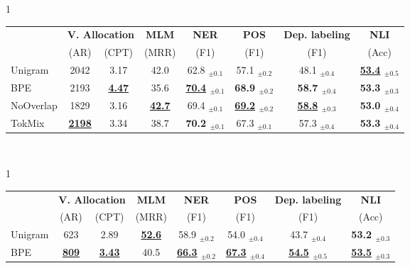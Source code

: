 \begin{table*}[!htb]
\centering
\begin{subtable}{1\linewidth}
  \centering
  \footnotesize
    \begin{tabular}{lccccccc}
    \toprule
    & \multicolumn{2}{c}{\bf{V. Allocation}}  &  \bf{MLM} &               \bf{NER} &               \bf{POS} &                \bf{Dep. labeling} &              \bf{NLI} \\
     & (AR) &   (CPT) &   (MRR) &               (F1) &               (F1) &                (F1) &              (Acc) \\
    \midrule
    Unigram   &      2042 &  3.17 &  42.0 &  62.8 $_{\pm0.1}$ &  57.1 $_{\pm0.2}$ &  48.1 $_{\pm0.4}$ &  \bf{\underline{53.4}} $_{\pm0.5}$ \\
    BPE       &      2193 &  \bf{\underline{4.47}} &  35.6 &  \bf{\underline{70.4}} $_{\pm0.1}$ &  \bf{68.9} $_{\pm0.2}$ &  \bf{58.7} $_{\pm0.4}$ &  \bf{53.3} $_{\pm0.3}$ \\
    NoOverlap &      1829 &  3.16 &  \bf{\underline{42.7}} &  69.4 $_{\pm0.1}$ &  \bf{\underline{69.2}} $_{\pm0.2}$ &  \bf{\underline{58.8}} $_{\pm0.3}$ &  \bf{53.0} $_{\pm0.4}$ \\
    TokMix    &      \bf{\underline{2198}} &  3.34 &  38.7 &  \bf{70.2} $_{\pm0.1}$ &  67.3 $_{\pm0.1}$ &  57.3 $_{\pm0.4}$ &  \bf{53.3} $_{\pm0.4}$ \\
    \bottomrule
    \end{tabular}
    \caption{6 languages}
    \label{tab:in_lang_avg}
\end{subtable} \\
\begin{subtable}{1\linewidth}
  \centering
    \small
    \begin{tabular}{lccccccc}
    \toprule
    & \multicolumn{2}{c}{\bf{V. Allocation}}  &  \bf{MLM} &               \bf{NER} &               \bf{POS} &                \bf{Dep. labeling} &              \bf{NLI} \\
     & (AR) &   (CPT) &   (MRR) &               (F1) &               (F1) &                (F1) &              (Acc) \\
    \midrule
    Unigram   &       623 &  2.89 &  \bf{\underline{52.6}} &  58.9 $_{\pm0.2}$ &  54.0 $_{\pm0.4}$ &  43.7 $_{\pm0.4}$ &  \bf{53.2} $_{\pm0.3}$ \\
    BPE       &       \bf{\underline{809}} &  \bf{\underline{3.43}} &  40.5 &  \bf{\underline{66.3}} $_{\pm0.2}$ &  \bf{\underline{67.3}} $_{\pm0.4}$ &  \bf{\underline{54.5}} $_{\pm0.5}$ &  \bf{\underline{53.5}} $_{\pm0.3}$ \\

\end{tabular}
\end{subtable}
\end{table*}
